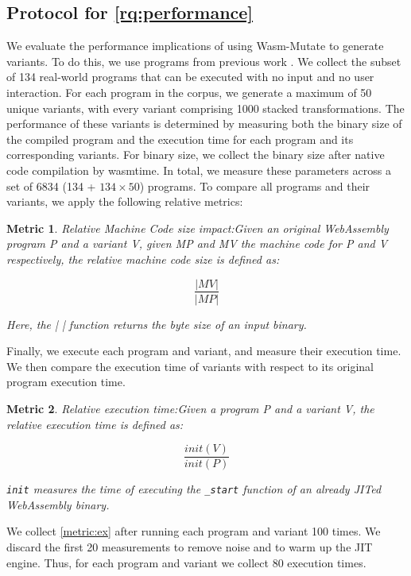 \documentclass[a4paper,fleqn]{cas-dc}
\newcommand{\tool}{{\sc Wasm-Mutate}\xspace}
\newcommand{\Wasm}{WebAssembly\xspace}
\newtheorem{metric}{Metric}
\newenvironment{revision1}{\color{blue}}{}
\begin{document}
\begin{revision1}

\subsection{Protocol for \ref{rq:performance}}
We evaluate the performance implications of using \tool to generate variants. 
To do this, we use programs from previous work \cite{hilbig2021empirical}. 
We collect the subset of 134 real-world programs that can be executed with no input and no user interaction.
For each program in the corpus, we generate a maximum of 50 unique variants, with every variant comprising 1000 stacked transformations. 
The performance of these variants is determined by measuring both the binary size of the compiled program and the execution time for each program and its corresponding variants. 
For binary size, we collect the  binary size after native code compilation by wasmtime.
In total, we measure these parameters across a set of 6834 (134 + $134\times50$) programs. 
To compare all programs and their variants, we apply the following relative metrics:


\begin{metric}{Relative Machine Code size impact:}\label{metric:mcize} Given an original \Wasm program P and a variant V, given MP and MV the machine code for P and V respectively, the relative machine code size is defined as:

$$
    \frac{|MV|}{|MP|}
$$

Here, the \textit{| |} function returns the byte size of an input binary.     
\end{metric}

Finally, we execute each program and variant, and measure their execution time. 
We then compare the execution time of variants with respect to its original program execution time.

\begin{metric}{Relative execution time:}\label{metric:ex}
Given a program P and a variant V, the relative execution time is defined as:

$$
    \frac{init(V)}{init(P)}
$$

\texttt{init} measures the time of executing the \texttt{_start} function of an already JITed \Wasm binary.
\end{metric}

We collect \autoref{metric:ex} after running each program and variant 100 times.
We discard the first 20 measurements to remove noise and to warm up the JIT engine.
Thus, for each program and variant we collect 80 execution times.
  
\end{revision1}
\end{document}
